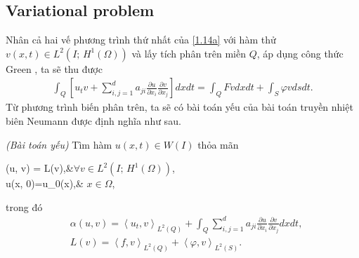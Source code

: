 \documentclass[]{article}
\begin{document}
\subsection{Variational problem}
\qquad Nhân cả hai vế phương trình thứ nhất của \eqref{1.14a} với hàm thử $v(x, t)\in L^2(I;\, H^1(\Omega))$ và lấy tích phân trên miền $Q$, áp dụng công thức Green \cite{b6}, ta sẽ thu được
\begin{align*}
	\int_{Q}\left[u_tv+\sum_{i, j=1}^{d}a_{ji}\frac{\partial u}{\partial x_i}\frac{\partial v}{\partial x_j}\right]dxdt=\int_{Q}Fvdxdt+\int_{S}\varphi vdsdt.
\end{align*}
Từ phương trình biến phân trên, ta sẽ có bài toán yếu của bài toán truyền nhiệt biên Neumann được định nghĩa như sau.
\begin{dn}{\textit{(Bài toán yếu)}}\label{dn2.1}
	Tìm hàm $u(x, t)\in W(I)$ thỏa mãn
	\begin{subnumcases}{}
		\alpha(u, v) = L(v),&$\forall v\in L^2(I;\, H^1(\Omega))$,\label{2.1a}\\
		u(x, 0)=u_0(x),& $x\in \Omega$, \label{2.1b}
	\end{subnumcases}
	trong đó
	\begin{align*}
		&\alpha(u, v) = \left\langle u_t, v\right\rangle_{L^2(Q)}+\int_{Q}\sum_{i, j=1}^{d}a_{ji}\frac{\partial u}{\partial x_i}\frac{\partial v}{\partial x_j}dxdt,\\
		&L(v)=\left\langle f, v\right\rangle_{L^2(Q)}+\left\langle \varphi, v\right\rangle_{L^2(S)}.
	\end{align*}
\end{dn}
\end{document}
